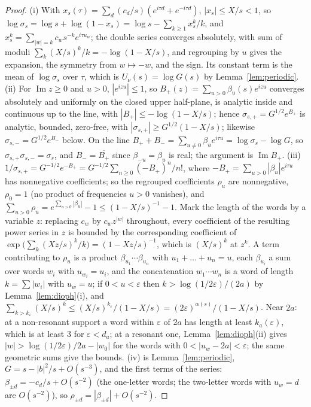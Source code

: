 \documentclass[11pt]{article}
\theoremstyle{definition}
\theoremstyle{remark}
\DeclareMathOperator{\Imm}{Im}
\begin{document}
\begin{proof}
(i) With $x_s(\tau)=\sum_d(c_d/s)(e^{i\tau d}+e^{-i\tau d})$, $|x_s|\le X/s<1$, so $\log\sigma_s=\log s+\log(1-x_s)=\log s-\sum_{k\ge1}x_s^k/k$, and $x_s^k=\sum_{|w|=k}c_ws^{-k}e^{i\tau u_w}$; the double series converges absolutely, with sum of moduli $\sum_k(X/s)^k/k=-\log(1-X/s)$, and regrouping by $u$ gives the expansion, the symmetry from $w\mapsto-w$, and the sign. Its constant term is the mean of $\log\sigma_s$ over $\tau$, which is $U_\nu(s)=\log G(s)$ by Lemma~\ref{lem:periodic}. (ii) For $\Imm z\ge0$ and $u>0$, $|e^{izu}|\le1$, so $B_+(z)=\sum_{u>0}\beta_u(s)e^{izu}$ converges absolutely and uniformly on the closed upper half-plane, is analytic inside and continuous up to the line, with $|B_+|\le-\log(1-X/s)$; hence $\sigma_{s,+}=G^{1/2}e^{B_+}$ is analytic, bounded, zero-free, with $|\sigma_{s,+}|\ge G^{1/2}(1-X/s)$; likewise $\sigma_{s,-}=G^{1/2}e^{B_-}$ below. On the line $B_++B_-=\sum_{u\ne0}\beta_ue^{i\tau u}=\log\sigma_s-\log G$, so $\sigma_{s,+}\sigma_{s,-}=\sigma_s$, and $B_-=\overline{B_+}$ since $\beta_{-u}=\beta_u$ is real; the argument is $\Imm B_+$. (iii) $1/\sigma_{s,+}=G^{-1/2}e^{-B_+}=G^{-1/2}\sum_{n\ge0}(-B_+)^n/n!$, where $-B_+=\sum_{u>0}|\beta_u|e^{i\tau u}$ has nonnegative coefficients; so the regrouped coefficients $\rho_u$ are nonnegative, $\rho_0=1$ (no product of frequencies $u>0$ vanishes), and $\sum_{u>0}\rho_u=e^{\sum_{u>0}|\beta_u|}-1\le(1-X/s)^{-1}-1$. Mark the length of the words by a variable $z$: replacing $c_w$ by $c_wz^{|w|}$ throughout, every coefficient of the resulting power series in $z$ is bounded by the corresponding coefficient of $\exp\big(\sum_k(Xz/s)^k/k\big)=(1-Xz/s)^{-1}$, which is $(X/s)^k$ at $z^k$. A term contributing to $\rho_u$ is a product $\beta_{u_1}\cdots\beta_{u_n}$ with $u_1+\dots+u_n=u$, each $\beta_{u_i}$ a sum over words $w_i$ with $u_{w_i}=u_i$, and the concatenation $w_1\cdots w_n$ is a word of length $k=\sum|w_i|$ with $u_w=u$; if $0<u<\varepsilon$ then $k>\log(1/2\varepsilon)/(2a)$ by Lemma~\ref{lem:dioph}(i), and $\sum_{k>k_\varepsilon}(X/s)^k\le(X/s)^{k_\varepsilon}/(1-X/s)=(2\varepsilon)^{\alpha(s)}/(1-X/s)$. Near $2a$: at a non-resonant support a word within $\varepsilon$ of $2a$ has length at least $k_a(\varepsilon)$, which is at least $3$ for $\varepsilon<d_a$; at a resonant one, Lemma~\ref{lem:dioph}(ii) gives $|w|>\log(1/2\varepsilon)/2a-|w_0|$ for the words with $0<|u_w-2a|<\varepsilon$; the same geometric sums give the bounds. (iv) is Lemma~\ref{lem:periodic}, $G=s-|b|^2/s+O(s^{-3})$, and the first terms of the series: $\beta_{\pm d}=-c_d/s+O(s^{-2})$ (the one-letter words; the two-letter words with $u_w=d$ are $O(s^{-2})$), so $\rho_{\pm d}=|\beta_{\pm d}|+O(s^{-2})$.
\end{proof}
\end{document}
